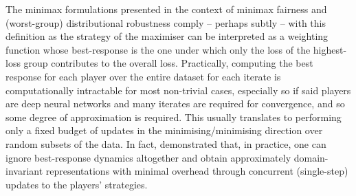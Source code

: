 %
The minimax formulations presented in the context of minimax fairness and (worst-group)
distributional robustness comply -- perhaps subtly -- with this definition as the strategy of the
maximiser can be interpreted as a weighting function whose best-response is the one under which
only the loss of the highest-loss group contributes to the overall loss. 
%
Practically, computing the best response for each player over the entire dataset for each iterate is
computationally intractable for most non-trivial cases, especially so if said players are deep
neural networks and many iterates are required for convergence, and so some degree of approximation
is required.
%
This usually translates to performing only a fixed budget of updates in the minimising/minimising
direction over random subsets of the data.
%
In fact, \cite{ganin2016domain} demonstrated that, in practice, one can ignore best-response
dynamics altogether and obtain approximately domain-invariant representations with minimal overhead
through concurrent (single-step) updates to the players' strategies.

